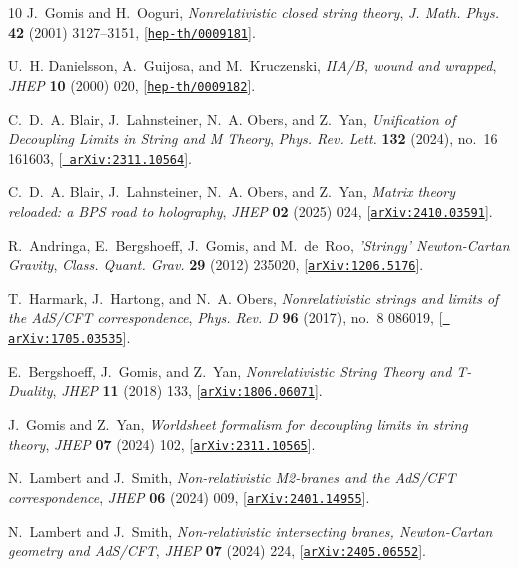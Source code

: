 \documentclass[11pt]{article}
\numberwithin{equation}{section}
\begin{document}
{{\begin{thebibliography}{10}
J.~Gomis and H.~Ooguri, {\it {Nonrelativistic closed string theory}},  {\em J.
  Math. Phys.} {\bf 42} (2001) 3127--3151,
  [\href{http://arxiv.org/abs/hep-th/0009181}{{\tt hep-th/0009181}}].

U.~H. Danielsson, A.~Guijosa, and M.~Kruczenski, {\it {IIA/B, wound and
  wrapped}},  {\em JHEP} {\bf 10} (2000) 020,
  [\href{http://arxiv.org/abs/hep-th/0009182}{{\tt hep-th/0009182}}].

C.~D.~A. Blair, J.~Lahnsteiner, N.~A. Obers, and Z.~Yan, {\it {Unification of
  Decoupling Limits in String and M Theory}},  {\em Phys. Rev. Lett.} {\bf 132}
  (2024), no.~16 161603, [\href{http://arxiv.org/abs/2311.10564}{{\tt
  arXiv:2311.10564}}].

C.~D.~A. Blair, J.~Lahnsteiner, N.~A. Obers, and Z.~Yan, {\it {Matrix theory
  reloaded: a BPS road to holography}},  {\em JHEP} {\bf 02} (2025) 024,
  [\href{http://arxiv.org/abs/2410.03591}{{\tt arXiv:2410.03591}}].

R.~Andringa, E.~Bergshoeff, J.~Gomis, and M.~de~Roo, {\it {'Stringy'
  Newton-Cartan Gravity}},  {\em Class. Quant. Grav.} {\bf 29} (2012) 235020,
  [\href{http://arxiv.org/abs/1206.5176}{{\tt arXiv:1206.5176}}].

T.~Harmark, J.~Hartong, and N.~A. Obers, {\it {Nonrelativistic strings and
  limits of the AdS/CFT correspondence}},  {\em Phys. Rev. D} {\bf 96} (2017),
  no.~8 086019, [\href{http://arxiv.org/abs/1705.03535}{{\tt
  arXiv:1705.03535}}].

E.~Bergshoeff, J.~Gomis, and Z.~Yan, {\it {Nonrelativistic String Theory and
  T-Duality}},  {\em JHEP} {\bf 11} (2018) 133,
  [\href{http://arxiv.org/abs/1806.06071}{{\tt arXiv:1806.06071}}].

J.~Gomis and Z.~Yan, {\it {Worldsheet formalism for decoupling limits in string
  theory}},  {\em JHEP} {\bf 07} (2024) 102,
  [\href{http://arxiv.org/abs/2311.10565}{{\tt arXiv:2311.10565}}].

N.~Lambert and J.~Smith, {\it {Non-relativistic M2-branes and the AdS/CFT
  correspondence}},  {\em JHEP} {\bf 06} (2024) 009,
  [\href{http://arxiv.org/abs/2401.14955}{{\tt arXiv:2401.14955}}].

N.~Lambert and J.~Smith, {\it {Non-relativistic intersecting branes,
  Newton-Cartan geometry and AdS/CFT}},  {\em JHEP} {\bf 07} (2024) 224,
  [\href{http://arxiv.org/abs/2405.06552}{{\tt arXiv:2405.06552}}].


\end{thebibliography}}}
\end{document}
